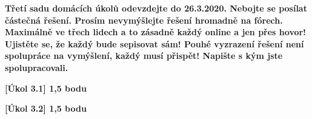 \textbf{
	Třetí sadu domácích úkolů odevzdejte do 26.3.2020.
	Nebojte se posílat částečná řešení.
	Prosím nevymýšlejte řešení hromadně na fórech.
	Maximálně ve třech lidech a to zásadně každý online a jen přes hovor!
	Ujistěte se, že každý bude sepisovat sám!
	Pouhé vyzrazení řešení není spolupráce na vymýšlení, každý musí přispět!
	Napište s kým jste spolupracovali.
}

\textbf{[Úkol 3.1] 1,5 bodu}

\textbf{[Úkol 3.2] 1,5 bodu}


